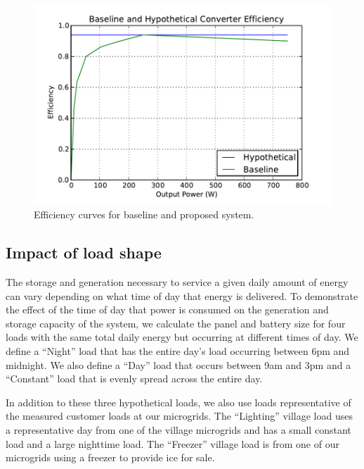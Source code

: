 \documentclass[conference]{IEEEtran}
\begin{document}
\begin{figure}[]
\begin{center}
\includegraphics[width=\columnwidth]{figures/inverter_curves.pdf}
\end{center}
\caption{Efficiency curves for baseline and proposed system.}
\label{inverter_curves}
\end{figure}

\subsection{Impact of load shape}

The storage and generation necessary to service a given daily
amount of energy can vary depending on what time of day
that energy is delivered.
To demonstrate the effect of the time of day that power
is consumed on the generation and storage capacity of the system,
we calculate the panel and battery size for four loads with
the same total daily energy but occurring at different times of day.
We define a ``Night'' load that has the entire day's load 
occurring between 6pm and midnight.
We also define a ``Day'' load that occurs between 9am and 3pm 
and a ``Constant'' load that is evenly spread across the entire day.

In addition to these three hypothetical loads, we also use loads
representative of the measured customer loads at our microgrids. 
The ``Lighting'' village load uses a representative day from one of the
village microgrids and has a small constant load and a large
nighttime load.
The ``Freezer'' village load is from one of our microgrids using a freezer
to provide ice for sale.
\end{document}
